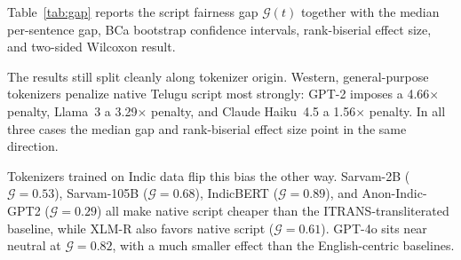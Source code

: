 ﻿\documentclass[11pt]{article}
\begin{document}
Table~\ref{tab:gap} reports the script fairness gap $\mathcal{G}(t)$
together with the median per-sentence gap, BCa bootstrap confidence
intervals, rank-biserial effect size, and two-sided Wilcoxon result.
\begin{table}[H]
\centering
{}
\caption{Script fairness gap $\mathcal{G}(t)$, median $\delta$, 95\% CI,
         rank-biserial effect size, and two-sided Wilcoxon $p$ ($n=1{,}000$).
         $\mathcal{G}(t){>}1$: native costlier; $\mathcal{G}(t){<}1$: romanized costlier.}
\label{tab:gap}
\end{table}
The results still split cleanly along tokenizer origin. Western,
general-purpose tokenizers penalize native Telugu script most
strongly: GPT-2 imposes a 4.66$\times$ penalty, Llama~3 a 3.29$\times$
penalty, and Claude Haiku~4.5 a 1.56$\times$ penalty. In all three
cases the median gap and rank-biserial effect size point in the same
direction.

Tokenizers trained on Indic data flip this bias the other way.
Sarvam-2B ($\mathcal{G}=0.53$), Sarvam-105B ($\mathcal{G}=0.68$),
IndicBERT ($\mathcal{G}=0.89$), and Anon-Indic-GPT2
($\mathcal{G}=0.29$) all make native script cheaper than the
ITRANS-transliterated baseline, while XLM-R also favors native script
($\mathcal{G}=0.61$). GPT-4o sits near neutral at
$\mathcal{G}=0.82$, with a much smaller effect than the English-centric
baselines.
\end{document}
